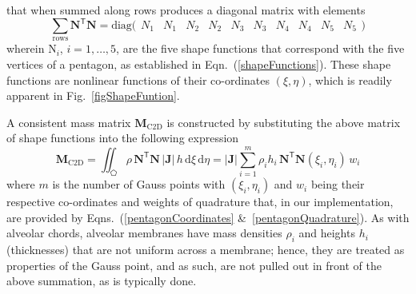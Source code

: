 \normalsize
that when summed along rows produces a diagonal matrix with elements
\begin{equation}
    \sum_{\mathrm{rows}} \mathbf{N}^{\mathsf{T}} \mathbf{N} = 
    \mathrm{diag} \bigl( \begin{matrix}
    N_1 & N_1 & N_2 & N_2 & N_3 & N_3 & N_4 & N_4 & N_5 & N_5
    \end{matrix} \bigr)
\end{equation}
wherein $\mathrm{N}_i$, $i = 1, \ldots, 5$, are the five shape functions that correspond with the five vertices of a pentagon, as established in Eqn.~(\ref{shapeFunctions}).  These shape functions are nonlinear functions of their co-ordinates $(\xi,\eta)$, which is readily apparent in Fig.~\ref{figShapeFuntion}.

A consistent mass matrix $\mathbf{M}_{\mathrm{C2D}}$ is constructed by substituting the above matrix of shape functions into the following expression
\begin{equation}
    \mathbf{M}_{\mathrm{C2D}} = \iint_{\pentagon} \rho \, \mathbf{N}^{\mathsf{T}} \mathbf{N} \,|\mathbf{J}| \, h \, \mathrm{d} \xi \, \mathrm{d} \eta 
    = | \mathbf{J} | \sum_{i=1}^m \rho_i h_i \, \mathbf{N}^{\mathsf{T}} \mathbf{N} 
    (\xi_i , \eta_i) \, w_i
    \label{massintegral2d}
\end{equation}
where $m$ is the number of Gauss points with $( \xi_i , \eta_i )$ and $w_i$ being their respective co-ordinates and weights of quadrature that, in our implementation, are provided by Eqns.~(\ref{pentagonCoordinates} \&\ \ref{pentagonQuadrature}).  As with alveolar chords, alveolar membranes have mass densities $\rho_i$ and heights $h_i$ (thicknesses) that are not uniform across a membrane; hence, they are treated as properties of the Gauss point, and as such, are not pulled out in front of the above summation, as is typically done.


